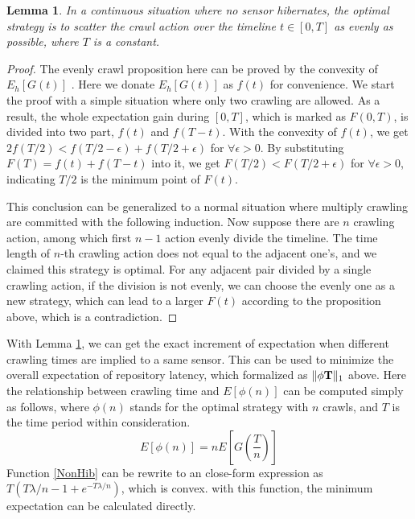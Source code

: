 \documentclass[conference]{IEEEtran}
\newtheorem{lemma}{Lemma}
\begin{document}
\begin{lemma}
\label{evenly}
In a continuous situation where no sensor hibernates, the optimal strategy is to scatter the crawl action over the timeline $t\in [0, T]$ as evenly as possible, where $T$ is a constant.
\end{lemma}

\begin{proof}
The evenly crawl proposition here can be proved by the convexity of $E_h[G(t)]$ \cite{boyd2004convex}. Here we donate $E_h[G(t)]$ as $f(t)$ for convenience. 
We start the proof with a simple situation where only two crawling are allowed. 
As a result, the whole expectation gain during $[0,T]$, which is marked as $F(0, T)$, is divided into two part, $f(t)$ and $f(T-t)$. With the convexity of $f(t)$, we get $2f(T/2)<f(T/2-\epsilon)+f(T/2+\epsilon)$ for $\forall{\epsilon>0}$. By substituting $F(T)=f(t)+f(T-t)$ into it, we get $F(T/2)<F(T/2+\epsilon)$ for $\forall{\epsilon>0}$, indicating $T/2$ is the minimum point of $F(t)$.


This conclusion can be generalized to a normal situation where multiply crawling are committed with the following induction. 
Now suppose there are $n$ crawling action, among which first $n-1$ action evenly divide the timeline. The time length of $n$-th crawling action does not equal to the adjacent one's, and we claimed this strategy is optimal. For any adjacent pair divided by a single crawling action, if the division is not evenly, we can choose the evenly one as a new strategy, which can lead to a larger $F(t)$ according to the proposition above, which is a contradiction.
\end{proof}


With Lemma \ref{evenly}, we can get the exact increment of expectation when different crawling times are implied to a same sensor. This can be used to minimize the overall expectation of repository latency, which formalized as $\Arrowvert \phi\mathbf{T} \Arrowvert_{1}$ above.
Here the relationship between crawling time and $E[\phi(n)]$ can be computed simply as follows, where $\phi(n)$ stands for the optimal strategy with $n$ crawls, and $T$ is the time period within consideration. 
\begin{equation}
E[\phi(n)]=nE[G(\frac{T}{n})]\label{NonHib}
\end{equation}
Function \eqref{NonHib} can be rewrite to an close-form expression as $T(T\lambda/n-1+e^{-T\lambda/n})$, which is convex. with this function, the minimum expectation can be calculated directly.
\end{document}
